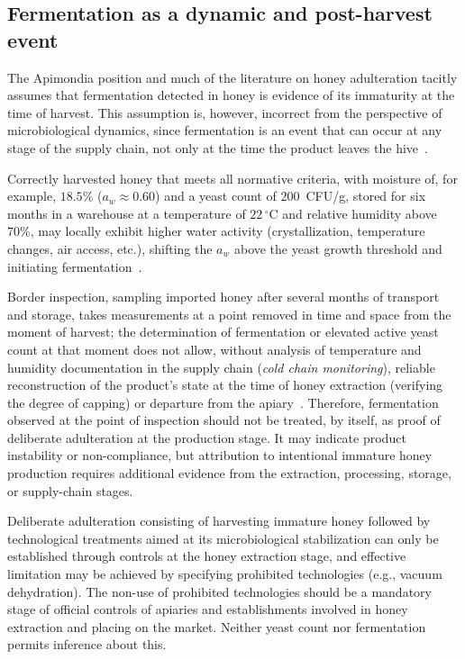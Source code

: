 \subsection{Fermentation as a dynamic and post-harvest event}

The Apimondia position and much of the literature on honey
adulteration tacitly assumes that fermentation detected in honey
is evidence of its immaturity at the time of harvest.
This assumption is, however, incorrect from the perspective of
microbiological dynamics, since fermentation is an event that can
occur at any stage of the supply chain, not only at the time
the product leaves the hive~\cite{apinz2021,analytica2020}.

Correctly harvested honey that meets all normative criteria,
with moisture of, for example, $18.5\%$ ($a_w \approx 0.60$)
and a yeast count of $200$~CFU/g, stored for six months in a
warehouse at a temperature of $22\,^\circ$C and relative humidity
above 70\%, may locally exhibit higher water activity
(crystallization, temperature changes, air access, etc.), shifting
the $a_w$ above the yeast growth threshold and initiating
fermentation~\cite{apinz2021}.

Border inspection, sampling imported honey after several months
of transport and storage, takes measurements at a point removed
in time and space from the moment of harvest; the determination of
fermentation or elevated active yeast count at that moment does not
allow, without analysis of temperature and humidity documentation
in the supply chain (\textit{cold chain monitoring}), reliable
reconstruction of the product's state at the time of honey
extraction (verifying the degree of capping) or departure from
the apiary~\cite{tsagkaris2021,schoder2026}.
Therefore, fermentation observed at the point of inspection should not be treated, by itself, as proof of deliberate adulteration at the production stage. It may indicate product instability or non-compliance, but attribution to intentional immature honey production requires additional evidence from the extraction, processing, storage, or supply-chain stages.

Deliberate adulteration consisting of
harvesting immature honey followed by technological treatments
aimed at its microbiological stabilization can only be established
through controls at the honey extraction stage, and effective
limitation may be achieved by specifying prohibited technologies
(e.g., vacuum dehydration). The non-use of prohibited technologies
should be a mandatory stage of official controls of apiaries and
establishments involved in honey extraction and placing on the
market. Neither yeast count nor fermentation permits inference
about this.
